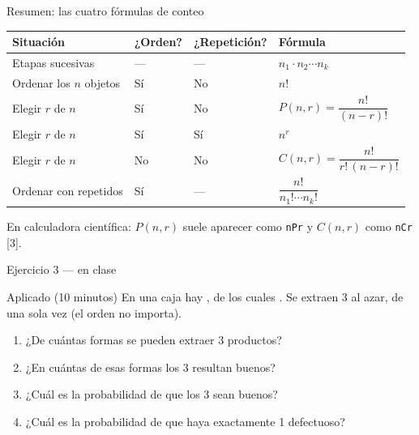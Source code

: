 \documentclass[aspectratio=169,10pt]{beamer}
\begin{document}
\begin{frame}{Resumen: las cuatro fórmulas de conteo}
  \footnotesize
  \begin{center}
  \begin{tabular}{@{}llll@{}}
    \toprule
    \textbf{Situación} & \textbf{¿Orden?} & \textbf{¿Repetición?} &
    \textbf{Fórmula} \\
    \midrule
    Etapas sucesivas          & ---   & --- & $n_1\cdot n_2\cdots n_k$ \\
    Ordenar los $n$ objetos   & Sí    & No  & $n!$ \\
    Elegir $r$ de $n$         & Sí    & No  & $P(n,r)=\dfrac{n!}{(n-r)!}$ \\[0.35em]
    Elegir $r$ de $n$         & Sí    & Sí  & $n^{r}$ \\[0.15em]
    Elegir $r$ de $n$         & No    & No  & $C(n,r)=\dfrac{n!}{r!\,(n-r)!}$ \\[0.35em]
    Ordenar con repetidos     & Sí    & ---  & $\dfrac{n!}{n_1!\cdots n_k!}$ \\
    \bottomrule
  \end{tabular}
  \end{center}

  \vspace{0.15cm}
  {\scriptsize\color{uniGris} En calculadora científica: $P(n,r)$ suele
  aparecer como \texttt{nPr} y $C(n,r)$ como \texttt{nCr}\,[3].}
\end{frame}

\begin{frame}{Ejercicio 3 — en clase}
  \begin{alertblock}{Aplicado (10 minutos)}
    En una caja hay , de los cuales . Se extraen 3 al azar, de una sola vez (el orden no importa).

    \vspace{0.25cm}
    \begin{enumerate}
      \item ¿De cuántas formas se pueden extraer 3 productos?
      \item ¿En cuántas de esas formas los 3 resultan buenos?
      \item ¿Cuál es la probabilidad de que los 3 sean buenos?
      \item ¿Cuál es la probabilidad de que haya exactamente 1 defectuoso?
    \end{enumerate}
  \end{alertblock}
\end{frame}
\end{document}
